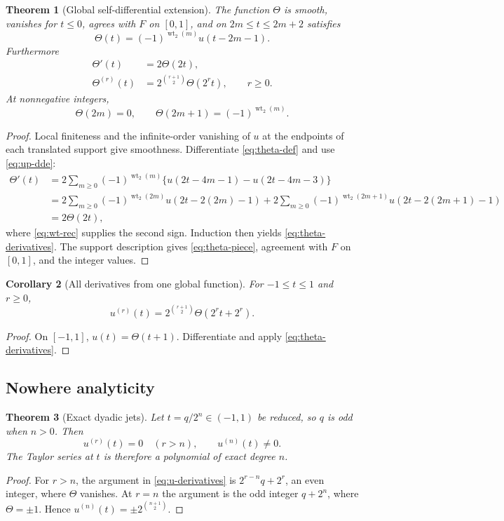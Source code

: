 \documentclass[11pt]{article}
\newtheorem{theorem}{Theorem}[section]
\newtheorem{corollary}[theorem]{Corollary}
\theoremstyle{definition}
\theoremstyle{remark}
\newcommand{\wt}{\operatorname{wt}_2}\newcommand{\upfun}{\operatorname{up}}
\begin{document}
\begin{theorem}[Global self-differential extension]\label{thm:theta}
The function $\Theta$ is smooth, vanishes for $t\le0$, agrees with $F$ on $[0,1]$, and on $2m\le t\le2m+2$ satisfies
\begin{equation}\label{eq:theta-piece}
 \Theta(t)=(-1)^{\wt(m)}u(t-2m-1).
\end{equation}
Furthermore
\begin{align}
 \Theta'(t)&=2\Theta(2t),\label{eq:theta-prime}\\
 \Theta^{(r)}(t)&=2^{\binom{r+1}{2}}\Theta(2^rt),\qquad r\ge0.\label{eq:theta-derivatives}
\end{align}
At nonnegative integers,
\[
 \Theta(2m)=0,
 \qquad
 \Theta(2m+1)=(-1)^{\wt(m)}.
\]
\end{theorem}
\begin{proof}
Local finiteness and the infinite-order vanishing of $u$ at the endpoints of each translated support give smoothness.  Differentiate \eqref{eq:theta-def} and use \eqref{eq:up-dde}:
\begin{align*}
 \Theta'(t)
 &=2\sum_{m\ge0}(-1)^{\wt(m)}
 \{u(2t-4m-1)-u(2t-4m-3)\}\\
 &=2\sum_{m\ge0}(-1)^{\wt(2m)}u(2t-2(2m)-1)
  +2\sum_{m\ge0}(-1)^{\wt(2m+1)}u(2t-2(2m+1)-1)\\
 &=2\Theta(2t),
\end{align*}
where \eqref{eq:wt-rec} supplies the second sign.  Induction then yields \eqref{eq:theta-derivatives}.  The support description gives \eqref{eq:theta-piece}, agreement with $F$ on $[0,1]$, and the integer values.
\end{proof}

\begin{corollary}[All derivatives from one global function]\label{cor:u-derivatives}
For $-1\le t\le1$ and $r\ge0$,
\begin{equation}\label{eq:u-derivatives}
 u^{(r)}(t)=2^{\binom{r+1}{2}}
 \Theta(2^rt+2^r).
\end{equation}
\end{corollary}
\begin{proof}
On $[-1,1]$, $u(t)=\Theta(t+1)$.  Differentiate and apply \eqref{eq:theta-derivatives}.
\end{proof}

\subsection{Nowhere analyticity}
\begin{theorem}[Exact dyadic jets]\label{thm:dyadic-jets}
Let $t=q/2^n\in(-1,1)$ be reduced, so $q$ is odd when $n>0$.  Then
\[
 u^{(r)}(t)=0\quad(r>n),
 \qquad
 u^{(n)}(t)\ne0.
\]
The Taylor series at $t$ is therefore a polynomial of exact degree $n$.
\end{theorem}
\begin{proof}
For $r>n$, the argument in \eqref{eq:u-derivatives} is
$2^{r-n}q+2^r$, an even integer, where $\Theta$ vanishes.  At $r=n$ the argument is the odd integer $q+2^n$, where $\Theta=\pm1$.  Hence
$u^{(n)}(t)=\pm2^{\binom{n+1}{2}}$.
\end{proof}
\end{document}
